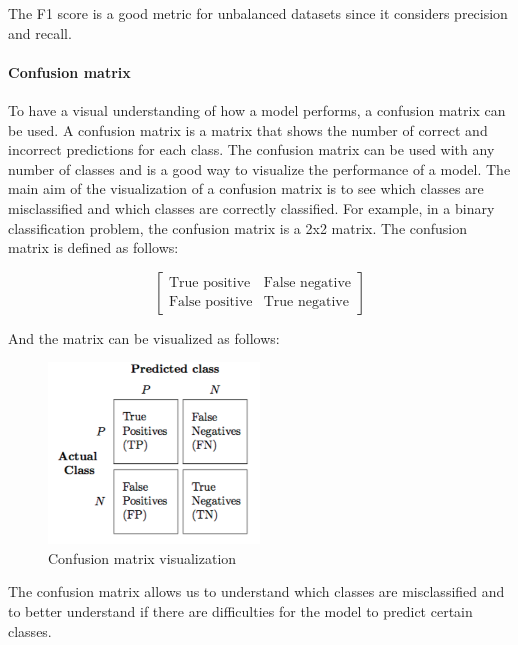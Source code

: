 The F1 score is a good metric for unbalanced datasets since it considers precision and recall. 

\paragraph*{Confusion matrix}

To have a visual understanding of how a model performs, a confusion matrix can be used. A confusion matrix is a matrix that shows the number of correct and incorrect predictions for each class. The confusion matrix can be used with any number of classes and is a good way to visualize the performance of a model. The main aim of the visualization of a confusion matrix is to see which classes are misclassified and which classes are correctly classified. For example, in a binary classification problem, the confusion matrix is a 2x2 matrix. The confusion matrix is defined as follows:

\begin{equation}
    \begin{bmatrix}
        \text{True positive} & \text{False negative} \\
        \text{False positive} & \text{True negative}
    \end{bmatrix}
\end{equation}

And the matrix can be visualized as follows:

\begin{figure}[H]
    \centering
    \includegraphics[width=0.5\textwidth]{images/confusion_matrix_example.png}
    \caption{Confusion matrix visualization}
    \label{fig:confusion_matrix}
\end{figure}

The confusion matrix allows us to understand which classes are misclassified and to better understand if there are difficulties for the model to predict certain classes.


